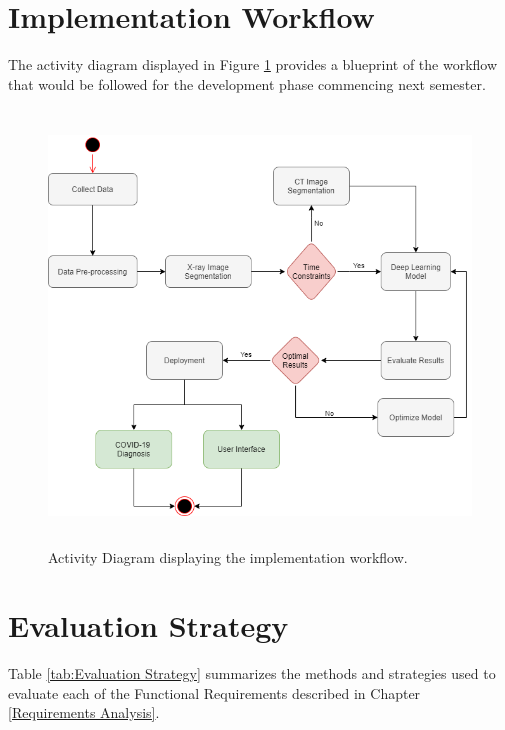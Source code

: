 \vspace{-2em}
\section{Implementation Workflow}
The activity diagram displayed in Figure \ref{fig:Implementation Methodology} provides a blueprint of the workflow that would be followed for the development phase commencing next semester. 


\begin{figure}[H]
 \centering
 \includegraphics[width=15.5cm, height=11.5cm]{Images/activityDiagram.png}
 \caption[Implementation Methodology]{Activity Diagram displaying the implementation workflow.}
 \label{fig:Implementation Methodology}
 \end{figure}
 
 \vspace{-2em}
\section{Evaluation Strategy} \label{Evaluation Strategy Section}
Table \ref{tab:Evaluation Strategy} summarizes the methods and strategies used to evaluate each of the Functional Requirements described in Chapter \ref{Requirements Analysis}.

